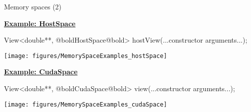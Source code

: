 \begin{frame}[fragile]{Memory spaces (2)}

  \ul{\textbf{Example: HostSpace}}

  \vspace{-3pt}

  \begin{code}[keywords={}]
View<double**, @boldHostSpace@bold> hostView(...constructor arguments...);
  \end{code}

  \vspace{-18pt}

  \begin{center}
    \texttt{[image: figures/MemorySpaceExamples\_hostSpace]}
  \end{center}

  \vspace{-10pt}
  \pause

  \ul{\textbf{Example: CudaSpace}}

  \vspace{-3pt}

  \begin{code}[keywords={}]
View<double**, @boldCudaSpace@bold> view(...constructor arguments...);
  \end{code}

  \vspace{-18pt}

  \begin{center}
    \texttt{[image: figures/MemorySpaceExamples\_cudaSpace]}
  \end{center}

  \vspace{-10pt}

\end{frame}


